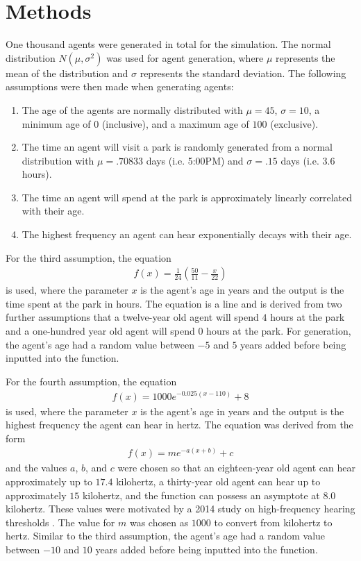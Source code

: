 \documentclass[twocolumn,11pt]{article}
\begin{document}
\section*{Methods}

One thousand agents were generated in total for the simulation. The normal distribution $N(\mu, \sigma^{2})$ was used for agent generation, where $\mu$ represents the mean of the distribution and $\sigma$ represents the standard deviation. The following assumptions were then made when generating agents:
\begin{enumerate}
    \item The age of the agents are normally distributed with $\mu = 45$, $\sigma = 10$, a minimum age of 0 (inclusive), and a maximum age of $100$ (exclusive). 
    \item The time an agent will visit a park is randomly generated from a normal distribution with $\mu = .70833$ days (i.e. 5:00PM) and $\sigma = .15$ days (i.e. $3.6$ hours).
    \item The time an agent will spend at the park is approximately linearly correlated with their age.
    \item The highest frequency an agent can hear exponentially decays with their age. 
\end{enumerate}

For the third assumption, the equation 
\begin{align*}
    f(x) = \frac{1}{24}(\frac{50}{11} - \frac{x}{22})
\end{align*} 
is used, where the parameter $x$ is the agent's age in years and the output is the time spent at the park in hours. The equation is a line and is derived from two further assumptions that a twelve-year old agent will spend $4$ hours at the park and a one-hundred year old agent will spend $0$ hours at the park. For generation, the agent's age had a random value between $-5$ and $5$ years added before being inputted into the function. 

For the fourth assumption, the equation 
\begin{align*}
    f(x) = 1000e^{-0.025 (x - 110)} + 8
\end{align*} is used, where the parameter $x$ is the agent's age in years and the output is the highest frequency the agent can hear in hertz. The equation was derived from the form 
\begin{align*}
    f(x) = me^{-a(x+b)}+c    
\end{align*}
and the values $a$, $b$, and $c$ were chosen so that an eighteen-year old agent can hear approximately up to $17.4$ kilohertz, a thirty-year old agent can hear up to approximately $15$ kilohertz, and the function can possess an asymptote at $8.0$ kilohertz. These values were motivated by a 2014 study on high-frequency hearing thresholds \citep{hearingthreshold}. The value for $m$ was chosen as $1000$ to convert from kilohertz to hertz. Similar to the third assumption, the agent's age had a random value between $-10$ and $10$ years added before being inputted into the function.
\end{document}
